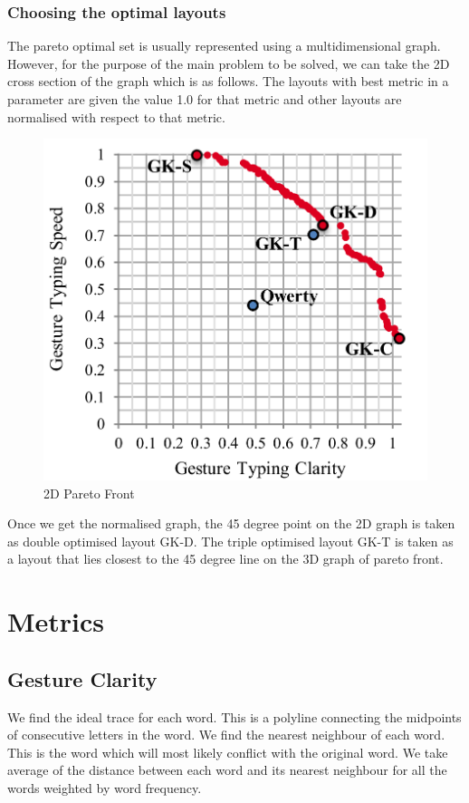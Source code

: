 \documentclass[12pt]{article}
\begin{document}
\newpage
\subsubsection{Choosing the optimal layouts}
The pareto optimal set is usually represented using a multidimensional graph. However, for the purpose of the main problem to be solved, we can take the 2D cross section of the graph which is as follows. The layouts with best metric in a parameter are given the value 1.0 for that metric and other layouts are normalised with respect to that metric.


\begin{figure}[h!]
	\centering
	\includegraphics[scale=0.5]{Images/svc}
	\caption{2D Pareto Front}
\end{figure}


Once we get the normalised graph, the 45 degree point on the 2D graph is taken as double optimised layout GK-D.
The triple optimised layout GK-T is taken as a layout that lies closest to the 45 degree line on the 3D graph of pareto front.

\section{Metrics}
\subsection{Gesture Clarity}
We find the ideal trace for each word. This is a polyline connecting the midpoints of consecutive letters in the word. We find the nearest neighbour of each word. This is the word which will most likely conflict with the original word. We take average of the distance between each word and its nearest neighbour for all the words weighted by word frequency.
\end{document}
